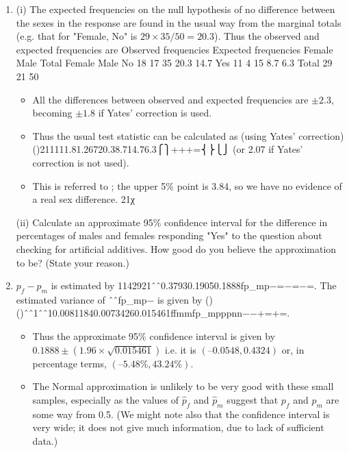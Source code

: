 \documentclass[a4paper,12pt]{article}
\begin{document}
\begin{enumerate}
\item (i) The expected frequencies on the null hypothesis of no difference between the sexes in the response are found in the usual way from the marginal totals (e.g. that for "Female, No" is $29\times35/50 = 20.3$). Thus the observed and expected frequencies are
Observed frequencies
Expected frequencies
Female
Male
Total
Female
Male
No
18
17
35
20.3
14.7
Yes
11
4
15
8.7
6.3
Total
29
21
50
\begin{itemize}
    \item All the differences between observed and expected frequencies are $\pm2.3$, becoming $\pm1.8$ if Yates' correction is used. 
        \item Thus the usual test statistic can be calculated as (using Yates' correction)
()211111.81.26720.38.714.76.3⎧⎫+++=⎨⎬⎩⎭
(or 2.07 if Yates' correction is not used).     \item This is referred to ; the upper 5\% point is 3.84, so we have no evidence of a real sex difference. 21χ
\end{itemize}

\newpage
\begin{framed}
(ii) Calculate an approximate 95\% confidence interval for the difference in percentages of males and females responding "Yes" to the question about checking for artificial additives.  How good do you believe the approximation to be?  (State your reason.)
 
\end{framed}
\item  $p_f - p_m$ is estimated by 1142921ˆˆ0.37930.19050.1888fp_mp−=−=−=. The estimated variance of ˆˆfp_mp− is given by
()()ˆˆ1ˆˆ10.00811840.00734260.015461ffmmfp_mpppnn−−+=+=.
\begin{itemize}
    \item Thus the approximate 95\% confidence interval is given by $0.1888 \pm (1.96\times \sqrt{0.015461})$ i.e. it is $(–0.0548, 0.4324)$ or, in percentage terms, $(–5.48\%, 43.24\%)$.
\item The Normal approximation is unlikely to be very good with these small samples, especially as the values of $\hat{p}_f$ and $\hat{p}_m$ suggest that $p_f$ and $p_m$ are some way from 0.5.
(We might note also that the confidence interval is very wide; it does not give much information, due to lack of sufficient data.)
\end{itemize}

\end{enumerate}
\end{document}
